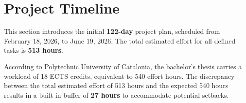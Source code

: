 \section{Project Timeline}
\label{sec:temporal-planning}

This section introduces the initial \textbf{122-day} project plan, scheduled from February 18, 2026, to June 19, 2026. The total estimated effort for all defined tasks is \textbf{513 hours}.

According to Polytechnic University of Catalonia, the bachelor's thesis carries a workload of 18 ECTS credits, equivalent to 540 effort hours. The discrepancy between the total estimated effort of 513 hours and the expected 540 hours results in a built-in buffer of \textbf{27 hours} to accommodate potential setbacks.









\newpage